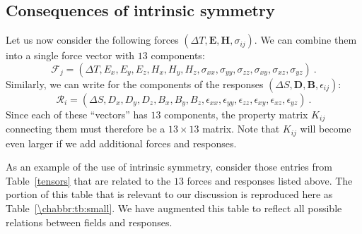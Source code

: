 \subsection{Consequences of intrinsic symmetry}
Let us now consider the following forces $(\Delta T,\mathbf{E},\mathbf{H},\sigma_{ij})$. We can combine them into a single force vector with $13$ components:
\begin{equation}
	\mathcal{F}_j = (\Delta T, E_x, E_y, E_z, H_x, H_y, H_z, \sigma_{xx},\sigma_{yy},\sigma_{zz},\sigma_{xy},\sigma_{xz},
	\sigma_{yz})\ .
\end{equation}
Similarly, we can write for the components of the responses $(\Delta S,\mathbf{D},\mathbf{B},\epsilon_{ij})$:
\begin{equation}
	\mathcal{R}_i = (\Delta S,D_x,D_y,D_z,B_x,B_y,B_z,\epsilon_{xx},\epsilon_{yy},\epsilon_{zz},\epsilon_{xy},\epsilon_{xz},
	\epsilon_{yz})\ .
\end{equation}
Since each of these ``vectors'' has $13$ components, the property matrix $K_{ij}$ connecting them must therefore be a $13\times 13$ matrix.  Note that $K_{ij}$ will become even larger if we add additional forces and responses.

As an example of the use of intrinsic symmetry, consider those entries from Table~\ref{tensors} that are related to the $13$ forces and responses listed above.  The portion of this table that is relevant to our discussion is reproduced here as Table~\ref{\chabbr:tb:small}.  We have augmented this table to reflect all possible relations between fields and responses.

